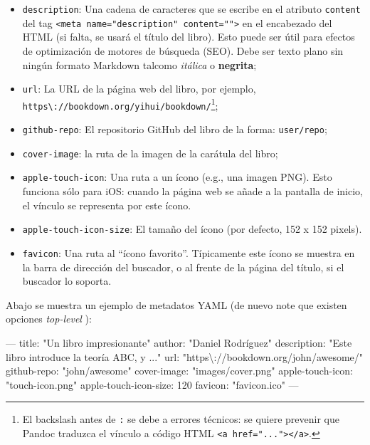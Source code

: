 \documentclass[12pt,]{krantz}
\makeatletter
\newenvironment{Shaded}{\begin{snugshade}}{\end{snugshade}}
\newcommand{\StringTok}[1]{\textcolor[rgb]{0.31,0.60,0.02}{#1}}
\newcommand{\OtherTok}[1]{\textcolor[rgb]{0.56,0.35,0.01}{#1}}
\newcommand{\FunctionTok}[1]{\textcolor[rgb]{0.00,0.00,0.00}{#1}}
\newcommand{\AttributeTok}[1]{\textcolor[rgb]{0.77,0.63,0.00}{#1}}
\providecommand{\tightlist}{%
  \setlength{\itemsep}{0pt}\setlength{\parskip}{0pt}}
\newenvironment{kframe}{%
\medskip{}
\setlength{\fboxsep}{.8em}
 \def\at@end@of@kframe{}%
 \ifinner\ifhmode%
  \def\at@end@of@kframe{\end{minipage}}%
  \begin{minipage}{\columnwidth}%
 \fi\fi%
 \def\FrameCommand##1{\hskip\@totalleftmargin \hskip-\fboxsep
 \colorbox{shadecolor}{##1}\hskip-\fboxsep
     \hskip-\linewidth \hskip-\@totalleftmargin \hskip\columnwidth}%
 \MakeFramed {\advance\hsize-\width
   \@totalleftmargin\z@ \linewidth\hsize
   \@setminipage}}%
 {\par\unskip\endMakeFramed%
 \at@end@of@kframe}
\renewenvironment{Shaded}{\begin{kframe}}{\end{kframe}}
\theoremstyle{definition}
\theoremstyle{definition}
\theoremstyle{definition}
\theoremstyle{remark}
\makeatother
\begin{document}
\begin{itemize}
\tightlist
\item
  \texttt{description}: Una cadena de caracteres que se escribe en el
  atributo \texttt{content} del tag
  \texttt{\textless{}meta\ name="description"\ content=""\textgreater{}}
  en el encabezado del HTML (si falta, se usará el título del libro).
  Esto puede ser útil para efectos de optimización de motores de
  búsqueda (SEO). Debe ser texto plano sin ningún formato Markdown
  talcomo \emph{itálica} o \textbf{negrita};
\item
  \texttt{url}: La URL de la página web del libro, por ejemplo,
  \texttt{https\textbackslash{}://bookdown.org/yihui/bookdown/}\footnote{El
    backslash antes de \texttt{:} se debe a errores técnicos: se quiere
    prevenir que Pandoc traduzca el vínculo a código HTML
    \texttt{\textless{}a\ href="..."\textgreater{}\textless{}/a\textgreater{}}.};
\item
  \texttt{github-repo}: El repositorio GitHub del libro de la forma:
  \texttt{user/repo};
\item
  \texttt{cover-image}: la ruta de la imagen de la carátula del libro;
\item
  \texttt{apple-touch-icon}: Una ruta a un ícono (e.g., una imagen PNG).
  Esto funciona sólo para iOS: cuando la página web se añade a la
  pantalla de inicio, el vínculo se representa por este ícono.
\item
  \texttt{apple-touch-icon-size}: El tamaño del ícono (por defecto, 152
  x 152 pixels).
\item
  \texttt{favicon}: Una ruta al ``ícono favorito''. Típicamente este
  ícono se muestra en la barra de dirección del buscador, o al frente de
  la página del título, si el buscador lo soporta.
\end{itemize}

Abajo se muestra un ejemplo de metadatos YAML (de nuevo note que existen
opciones \emph{top-level} ):

\begin{Shaded}
\begin{Highlighting}[]
\OtherTok{---}
\FunctionTok{title:}\AttributeTok{ }\StringTok{"Un libro impresionante"}
\FunctionTok{author:}\AttributeTok{ }\StringTok{"Daniel Rodríguez"}
\FunctionTok{description:}\AttributeTok{ }\StringTok{"Este libro introduce la teoría ABC, y ..."}
\FunctionTok{url:}\AttributeTok{ }\StringTok{"https\textbackslash{}://bookdown.org/john/awesome/"}
\FunctionTok{github-repo:}\AttributeTok{ }\StringTok{"john/awesome"}
\FunctionTok{cover-image:}\AttributeTok{ }\StringTok{"images/cover.png"}
\FunctionTok{apple-touch-icon:}\AttributeTok{ }\StringTok{"touch-icon.png"}
\FunctionTok{apple-touch-icon-size:}\AttributeTok{ 120}
\FunctionTok{favicon:}\AttributeTok{ }\StringTok{"favicon.ico"}
\OtherTok{---}
\end{Highlighting}
\end{Shaded}
\end{document}
